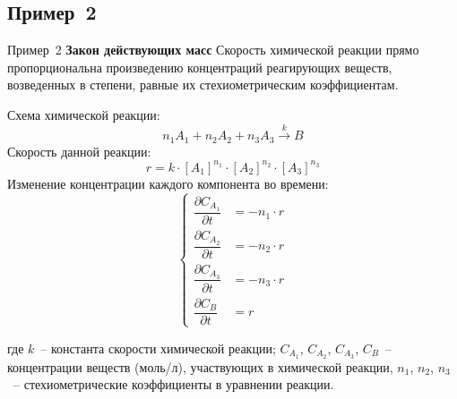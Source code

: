 \documentclass[aspectratio=169, mathserif]{beamer}	%
\begin{document}
\subsection{Пример~2}
\begin{frame}[fragile, label=c]{Пример~2}
\scriptsize
\alert{\textbf{Закон действующих масс}}
\vfill
Скорость химической реакции прямо пропорциональна произведению концентраций реагирующих веществ, возведенных в степени, равные их стехиометрическим коэффициентам.
\vfill
\begin{multicols}{2}
Схема химической реакции:
\vfill
$$
	n_1A_1 + n_2A_2 + n_3A_3 \overset{k}{\longrightarrow} B
$$
\vfill
Скорость данной реакции:
\vfill
$$
r = k \cdot \left[A_1\right]^{n_1} \cdot \left[A_2\right]^{n_2} \cdot \left[A_3\right]^{n_3}
$$
\vfill
\columnbreak
Изменение концентрации каждого компонента во времени:
\vfill
\begin{equation*}
	\left\{
	\begin{aligned}
		\dfrac{\partial C_{A_1}}{\partial t} &= -n_1 \cdot r \\
		\dfrac{\partial C_{A_2}}{\partial t} &= -n_2 \cdot r \\
		\dfrac{\partial C_{A_3}}{\partial t} &= -n_3 \cdot r \\
		\dfrac{\partial C_B}{\partial t} &= r
	\end{aligned}
	\right.
\end{equation*}
\end{multicols}
\vfill
где $k$~-- константа скорости химической реакции; $C_{A_1}$, $C_{A_2}$, $C_{A_3}$, $C_B$~-- концентрации веществ (моль/л), участвующих в химической реакции, $n_1$, $n_2$, $n_3$~-- стехиометрические коэффициенты в уравнении реакции.
\vfill
\end{frame}
\end{document}
